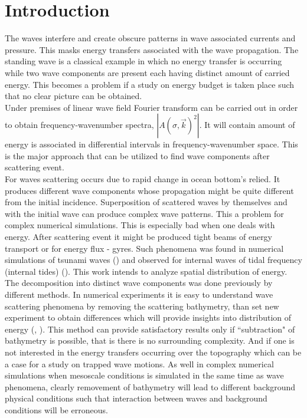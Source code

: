 \section{Introduction}
The waves interfere and create obscure patterns in wave associated currents and pressure. This masks energy transfers associated with the wave propagation. The standing wave is a classical example in which no energy transfer is occurring while two wave components are present each having distinct amount of carried energy. This becomes a problem if a study on energy budget is taken place such that no clear picture can be obtained.\\
Under premises of linear wave field Fourier transform can be carried out in order to obtain frequency-wavenumber spectra, $|A(\sigma, \vec{k})^2|$. It will contain amount of energy is associated in differential intervals in frequency-wavenumber space. This is the major approach that can be utilized to find wave components after scattering event.\\
For waves scattering occurs due to rapid change in ocean bottom's relied. It produces different wave components whose propagation might be quite different from the initial incidence. Superposition of scattered waves by themselves and with the initial wave can produce complex wave patterns. This a problem for complex numerical simulations. This is especially bad when one deals with energy. After scattering event it might be produced tight beams of energy transport or for energy flux - gyres. Such phenomena was found in numerical simulations  of tsunami waves (\cite{tang2012direct}) and observed for internal waves of tidal frequency (internal tides) (\cite{zhao2016global}). This work intends to analyze spatial distribution of energy.\\
The decomposition into distinct wave components was done previously by different methods. In numerical experiments it is easy to understand wave scattering phenomena by removing the scattering bathymetry, than set new experiment to obtain differences which will provide insights into distribution of energy (\cite{kowalik2008kuril}, \cite{klymak2016reflection}). This method can provide satisfactory results only if ``subtraction" of bathymetry is possible, that is there is no surrounding complexity. And if one is not interested in the energy transfers occurring over the topography which can be a case for a study on trapped wave motions. As well in complex numerical simulations when mesoscale conditions is simulated in the same time as wave phenomena, clearly removement of bathymetry will lead to different background physical conditions such that interaction between waves and background conditions will be erroneous.\\
